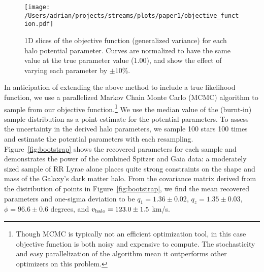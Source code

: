 \documentclass{emulateapj}
\begin{document}
\begin{figure}[h]
\begin{center}
\texttt{[image: /Users/adrian/projects/streams/plots/paper1/objective\_function.pdf]}
\caption{ 1D slices of the objective function (generalized variance) for each halo potential parameter. Curves are normalized to have the same value at the true parameter value (1.00), and show the effect of varying each parameter by $\pm10$\%. }\label{fig:objective}
\end{center}
\end{figure}

In anticipation of extending the above method to include a true
likelihood function, we use a parallelized Markov Chain Monte Carlo
(MCMC) algorithm \citep{foremanmackey2013} to sample from our
objective function.\footnote{Though MCMC is typically not an efficient
  optimization tool, in this case objective function is both noisy and
  expensive to compute. The stochasticity and easy parallelization of
  the algorithm mean it outperforms other optimizers on this problem.}
We use the median value of the (burnt-in) sample distribution as a
point estimate for the potential parameters. To assess the uncertainty
in the derived halo parameters, we sample 100 stars
100 times and estimate the potential parameters with each
resampling. Figure~\ref{fig:bootstrap} shows the recovered parameters
for each sample and demonstrates the power of the
combined Spitzer and Gaia data: a moderately sized sample of RR Lyrae
alone places quite strong constraints on the shape and mass of the
Galaxy's dark matter halo. From the covariance matrix derived from the 
distribution of points in Figure~\ref{fig:bootstrap}, we find the mean 
recovered parameters and one-sigma deviation to be 
$q_1 = 1.36 \pm 0.02$, $q_z = 1.35 \pm 0.03$, $\phi = 96.6 \pm 0.6$ degrees,
and $v_{\rm halo} = 123.0 \pm 1.5$ km/s.

\end{document}

